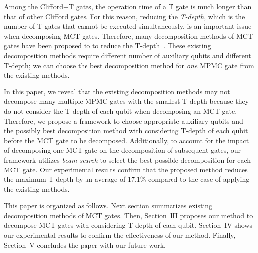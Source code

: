 Among the Clifford+T gates, the operation time of a T gate is much 
longer than that of other Clifford gates. For this reason, reducing
the {\it T-depth}, which is the number of T gates that cannot be
executed simultaneously, is an important issue when decomposing MCT
gates.
Therefore, many decomposition methods of MCT gates have been proposed to
 to reduce the T-depth~\cite{abdessaied2016technology,niemann2019t,baker2019decomposing}.
These existing decomposition methods require different number of 
auxiliary qubits and different T-depth; we can choose the best
decomposition method for {\it one} MPMC gate from the existing methods. 

In this paper, we reveal that the existing decomposition 
methods may not decompose many multiple MPMC gates with the smallest
T-depth because they do not consider the T-depth of each qubit when  
decomposing an MCT gate. Therefore, we propose a framework to choose 
appropriate auxiliary qubits and the possibly best decomposition
method with considering T-depth of each qubit before the MCT gate to
be decomposed.
Additionally, to account for the impact of decomposing one MCT
gate on the decomposition of subsequent gates, 
our framework 
utilizes {\it beam search} to select  the best possible decomposition for each MCT gate. 
Our experimental results confirm that the proposed method reduces the maximum T-depth
by an average of 17.1\% compared to the case of applying the existing
methods.




This paper is organized as follows.
Next section summarizes existing decomposition methods of MCT
gates. Then, Section~III proposes our method to decompose MCT gates 
with considering T-depth of each qubit. Section~IV shows our
experimental results to confirm the effectiveness of our
method. Finally, Section~V concludes the paper with our future work. 


